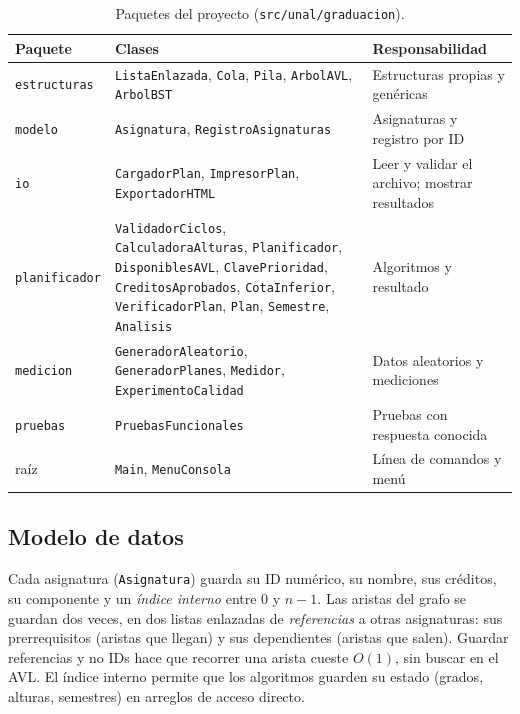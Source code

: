 \documentclass[11pt,letterpaper]{article}
\begin{document}
\begin{table}[H]
\centering
\small
\caption{Paquetes del proyecto (\texttt{src/unal/graduacion}).}
\label{tab:paquetes}
\begin{tabularx}{\linewidth}{@{}l L L@{}}
\toprule
\textbf{Paquete} & \textbf{Clases} & \textbf{Responsabilidad} \\
\midrule
\texttt{estructuras} & \texttt{ListaEnlazada}, \texttt{Cola}, \texttt{Pila}, \texttt{ArbolAVL}, \texttt{ArbolBST} & Estructuras propias y genéricas \\
\texttt{modelo} & \texttt{Asignatura}, \texttt{RegistroAsignaturas} & Asignaturas y registro por ID \\
\texttt{io} & \texttt{CargadorPlan}, \texttt{ImpresorPlan}, \texttt{ExportadorHTML} & Leer y validar el archivo; mostrar resultados \\
\texttt{planificador} & \texttt{ValidadorCiclos}, \texttt{CalculadoraAlturas}, \texttt{Planificador}, \texttt{DisponiblesAVL}, \texttt{ClavePrioridad}, \texttt{CreditosAprobados}, \texttt{CotaInferior}, \texttt{VerificadorPlan}, \texttt{Plan}, \texttt{Semestre}, \texttt{Analisis} & Algoritmos y resultado \\
\texttt{medicion} & \texttt{GeneradorAleatorio}, \texttt{GeneradorPlanes}, \texttt{Medidor}, \texttt{ExperimentoCalidad} & Datos aleatorios y mediciones \\
\texttt{pruebas} & \texttt{PruebasFuncionales} & Pruebas con respuesta conocida \\
raíz & \texttt{Main}, \texttt{MenuConsola} & Línea de comandos y menú \\
\bottomrule
\end{tabularx}
\end{table}

\subsection{Modelo de datos}
Cada asignatura (\texttt{Asignatura}) guarda su ID numérico, su nombre, sus créditos, su componente y un \emph{índice interno} entre $0$ y $n - 1$. Las aristas del grafo se guardan dos veces, en dos listas enlazadas de \emph{referencias} a otras asignaturas: sus prerrequisitos (aristas que llegan) y sus dependientes (aristas que salen). Guardar referencias y no IDs hace que recorrer una arista cueste $O(1)$, sin buscar en el AVL. El índice interno permite que los algoritmos guarden su estado (grados, alturas, semestres) en arreglos de acceso directo.
\end{document}
